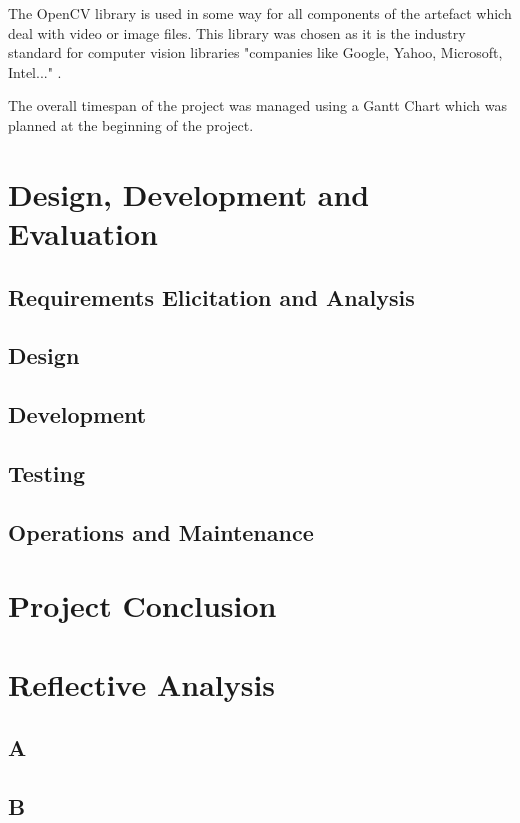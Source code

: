 \documentclass[11pt,a4paper]{report}
\begin{document}
The OpenCV library is used in some way for all components of the artefact which deal with video or image files. This library was chosen as it is the industry standard for computer vision libraries "companies like Google, Yahoo, Microsoft, Intel..." \citep{OpenCV}. 

The overall timespan of the project was managed using a Gantt Chart which was planned at the beginning of the project. 

\chapter{Design, Development and Evaluation}

\section{Requirements Elicitation and Analysis}

\section{Design}

\section{Development}

\section{Testing}

\section{Operations and Maintenance}

\chapter{Project Conclusion}

\chapter{Reflective Analysis}

\renewcommand\bibname{References}

\pagebreak

\appendix
{}
\section{A}
\section{B}
\end{document}
